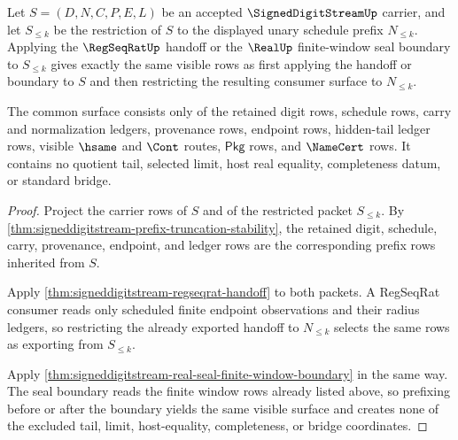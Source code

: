\begin{theorem}
\label{thm:signeddigitstream-prefix-handoff-idempotence}
Let $S=(D,N,C,P,E,L)$ be an accepted $\SignedDigitStreamUp$ carrier, and let
$S_{\leq k}$ be the restriction of $S$ to the displayed unary schedule prefix
$N_{\leq k}$. Applying the $\RegSeqRatUp$ handoff or the $\RealUp$
finite-window seal boundary to $S_{\leq k}$ gives exactly the same visible rows
as first applying the handoff or boundary to $S$ and then restricting the
resulting consumer surface to $N_{\leq k}$.

The common surface consists only of the retained digit rows, schedule rows,
carry and normalization ledgers, provenance rows, endpoint rows, hidden-tail
ledger rows, visible $\hsame$ and $\Cont$ routes, $\mathsf{Pkg}$ rows, and
$\NameCert$ rows. It contains no quotient tail, selected limit, host real
equality, completeness datum, or standard bridge.
\end{theorem}
\begin{proof}
Project the carrier rows of $S$ and of the restricted packet
$S_{\leq k}$. By \autoref{thm:signeddigitstream-prefix-truncation-stability},
the retained digit, schedule, carry, provenance, endpoint, and ledger rows are
the corresponding prefix rows inherited from $S$.

Apply \autoref{thm:signeddigitstream-regseqrat-handoff} to both packets. A
RegSeqRat consumer reads only scheduled finite endpoint observations and their
radius ledgers, so restricting the already exported handoff to $N_{\leq k}$
selects the same rows as exporting from $S_{\leq k}$.

Apply \autoref{thm:signeddigitstream-real-seal-finite-window-boundary} in the
same way. The seal boundary reads the finite window rows already listed above,
so prefixing before or after the boundary yields the same visible surface and
creates none of the excluded tail, limit, host-equality, completeness, or
bridge coordinates.
\end{proof}

